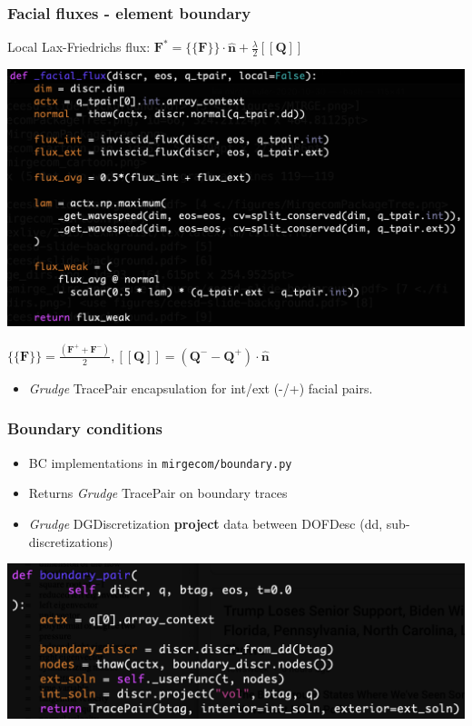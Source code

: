 \begin{frame}\frametitle{Facial fluxes - element boundary}
Local Lax-Friedrichs flux:
$\mathbf{F}^* = \{\{\mathbf{F}\}\}\cdot\hat{\mathbf{n}} + \frac{\lambda}{2}[[\mathbf{Q}]]$
\begin{center}
\includegraphics[width=.8\textwidth]{figures/facial_flux.png}
\end{center}
$\{\{\mathbf{F}\}\} = \frac{(\mathbf{F}^{+} + \mathbf{F}^{-})}{2}, [[\mathbf{Q}]] = (\mathbf{Q}^{-} - \mathbf{Q}^{+})\cdot\hat{\mathbf{n}}$
\begin{itemize}
\item \textit{Grudge} TracePair encapsulation for int/ext (-/+) facial pairs.
\end{itemize}
\end{frame}

\begin{frame}\frametitle{Boundary conditions}
\begin{itemize}
  \item BC implementations in \texttt{mirgecom/boundary.py}
  \item Returns \textit{Grudge} TracePair on boundary traces
  \item \textit{Grudge} DGDiscretization \textbf{project} data between DOFDesc (dd, sub-discretizations)
\end{itemize}
\begin{center}
\includegraphics[width=.8\textwidth]{figures/boundary_condition.png}
\end{center}
\end{frame}


